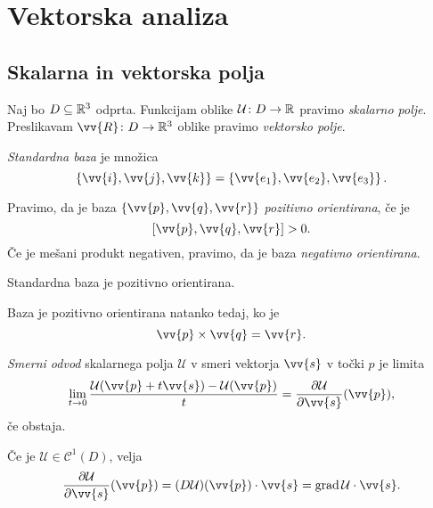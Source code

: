 \section{Vektorska analiza}

\subsection{Skalarna in vektorska polja}

\begin{definicija}
Naj bo $D \subseteq \mathbb{R}^3$ odprta. Funkcijam oblike
$\mathcal{U} \colon D \to \mathbb{R}$ pravimo
\emph{skalarno polje}. Preslikavam
$\vv{R} \colon D \to \R^3$ oblike pravimo \emph{vektorsko polje}.
\end{definicija}

\begin{definicija}
\emph{Standardna baza} je množica
\[
\set{\vv{i}, \vv{j}, \vv{k}} = \set{\vv{e_1}, \vv{e_2}, \vv{e_3}}.
\]
\end{definicija}

\begin{definicija}
Pravimo, da je baza $\set{\vv{p}, \vv{q}, \vv{r}}$
\emph{pozitivno orientirana}, če je
\[
[\vv{p}, \vv{q}, \vv{r}] > 0.
\]
Če je mešani produkt negativen, pravimo, da je baza
\emph{negativno orientirana}.
\end{definicija}

\begin{opomba}
Standardna baza je pozitivno orientirana.
\end{opomba}

\begin{opomba}
Baza je pozitivno orientirana natanko tedaj, ko je
\[
\vv{p} \times \vv{q} = \vv{r}.
\]
\end{opomba}


\begin{definicija}
\emph{Smerni odvod} skalarnega polja
$\mathcal{U}$ v smeri vektorja $\vv{s}$ v točki $p$ je limita
\[
\lim_{t \to 0}
\frac{\mathcal{U}(\vv{p} + t \vv{s}) - \mathcal{U}(\vv{p})}{t} =
\frac{\partial \mathcal{U}}{\partial \vv{s}}(\vv{p}),
\]
če obstaja.
\end{definicija}

\begin{opomba}
Če je $\mathcal{U} \in \mathcal{C}^1(D)$, velja
\[
\frac{\partial \mathcal{U}}{\partial \vv{s}}(\vv{p}) =
(D\mathcal{U})(\vv{p}) \cdot \vv{s} =
\grad \mathcal{U} \cdot \vv{s}.
\]
\end{opomba}

